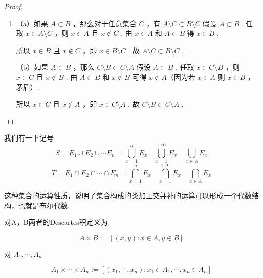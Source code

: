 \begin{proof}
\begin{enumerate}
		所以 $A\setminus B=\varnothing \Longleftrightarrow A \subset B$ .
		
		\item
		
		（a）如果 $A \subset B$ ，那么对于任意集合 $C$ ，有 $A\setminus C \subset B\setminus C$
		假设 $A \subset B$ .
		任取 $x \in A\setminus C$ ，则 $x \in A$ 且 $x \notin C$ .
		由 $x \in A$ 和 $A \subset B$ 得 $x \in B$ .
		
		所以 $x \in B$ 且 $x \notin C$ ，即 $x \in B\setminus C$ .
		故 $A\setminus C \subset B\setminus C$ .
		
		（b）如果 $A \subset B$ ，那么 $C\setminus B \subset C\setminus A$
		假设 $A \subset B$ .
		任取 $x \in C\setminus B$ ，则 $x \in C$ 且 $x \notin B$ .
		由 $A \subset B$ 和 $x \notin B$ 可得 $x \notin A$（因为若 $x \in A$ 则 $x \in B$ ，矛盾）.
		
		所以 $x \in C$ 且 $x \notin A$ ，即 $x \in C\setminus A$ .
		故 $C\setminus B \subset C\setminus A$ .
	\end{enumerate}
\end{proof}
我们有一下记号
	\[ S=E_1 \cup E_2 \cup \cdots E_n=\bigcup_{x=1}^n E_x\quad \bigcup_{x=1}^{+\infty} E_x\quad \bigcup_{x \in A} E_x \]
	\[T=E_1 \cap E_2 \cap \cdots \cap E_n=\bigcap_{x=1}^n E_x \quad \bigcap_{x=1}^{+\infty} E_x\quad \bigcap_{x \in A} E_x\]	
	
	
这种集合的运算性质，说明了集合构成的类加上交并补的运算可以形成一个代数结构，也就是布尔代数.
\begin{definition}
	对A，B两者的Descartes积定义为
	
	$$
	A \times B:=[(x, y): x \in A, y \in B]
	$$
	
	
	对 $A_1, \cdots, A_n$
	
	$$
	A_1 \times \cdots \times A_n:=\left[\left(x_1, \cdots, x_n\right): x_1 \in A_1, \cdots, x_n \in A_n\right]
	$$
\end{definition}
\newpage

